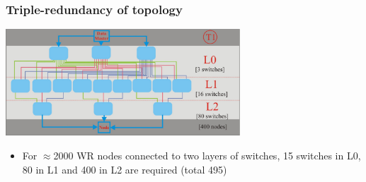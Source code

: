 \documentclass[]{beamer}
\begin{document}
\begin{frame}
  \frametitle{Triple-redundancy of topology}
  \centering
  \includegraphics[height=4cm,keepaspectratio]{robustness/tripleTopology}

  \begin{itemize}
  \item For $\approx$2000 WR nodes connected to two layers of switches,
        15 switches in L0, 80 in L1 and 400 in L2 are required (total 495)
  \end{itemize}

\end{frame}
\end{document}
